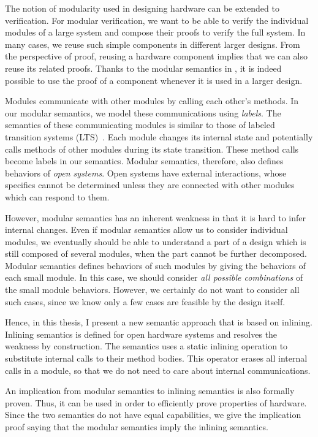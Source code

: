 The notion of modularity used in designing hardware can be extended to
verification. For modular verification, we want to be able to verify
the individual modules of a large system and compose their proofs to
verify the full system. In many cases, we reuse such simple components
in different larger designs. From the perspective of proof, reusing a
hardware component implies that we can also reuse its related
proofs. Thanks to the modular semantics in \Kami{}, it is indeed
possible to use the proof of a component whenever it is used in a
larger design.

Modules communicate with other modules by calling each other's
methods. In our modular semantics, we model these communications using
\emph{labels}. The semantics of these communicating modules is similar
to those of labeled transition systems (LTS)~\cite{lts}. Each module
changes its internal state and potentially calls methods of other
modules during its state transition. These method calls become labels
in our semantics. Modular semantics, therefore, also defines behaviors
of \emph{open systems}. Open systems have external interactions, whose
specifics cannot be determined unless they are connected with other
modules which can respond to them.

However, modular semantics has an inherent weakness in that it is hard
to infer internal changes. Even if modular semantics allow us to
consider individual modules, we eventually should be able to
understand a part of a design which is still composed of several
modules, when the part cannot be further decomposed. Modular semantics
defines behaviors of such modules by giving the behaviors of each
small module. In this case, we should consider \emph{all possible
  combinations} of the small module behaviors. However, we certainly
do not want to consider all such cases, since we know only a few cases
are feasible by the design itself.

Hence, in this thesis, I present a new semantic approach that is based
on inlining. Inlining semantics is defined for open hardware systems
and resolves the weakness by construction. The semantics uses a static
inlining operation to substitute internal calls to their method
bodies. This operator erases all internal calls in a module, so that
we do not need to care about internal communications.

An implication from modular semantics to inlining semantics is also
formally proven. Thus, it can be used in order to efficiently prove
properties of hardware. Since the two semantics do not have equal
capabilities, we give the implication proof saying that the modular
semantics imply the inlining semantics.

